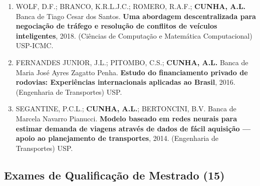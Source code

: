 \documentclass[
  brazilian,
  11pt,
  a4paper,
]{article}
\begin{document}
\begin{enumerate}
{  framework to analyse temporal and spatial distributions of crashes},
  2020. (PhD in Infrastructure Engineering) The University of Melbourne.
\item
  WOLF, D.F.; BRANCO, K.R.L.J.C.; ROMERO, R.A.F.; \textbf{CUNHA, A.L.}
  Banca de Tiago Cesar dos Santos. \textbf{Uma abordagem descentralizada
  para negociação de tráfego e resolução de conflitos de veículos
  inteligentes}, 2018. (Ciências de Computação e Matemática
  Computacional) USP-ICMC.
\item
  FERNANDES JUNIOR, J.L.; PITOMBO, C.S.; \textbf{CUNHA, A.L.} Banca de
  Maria José Ayres Zagatto Penha. \textbf{Estudo do financiamento
  privado de rodovias: Experiências internacionais aplicadas ao Brasil},
  2016. (Engenharia de Transportes) USP.
\item
  SEGANTINE, P.C.L.; \textbf{CUNHA, A.L.}; BERTONCINI, B.V. Banca de
  Marcela Navarro Pianucci. \textbf{Modelo baseado em redes neurais para
  estimar demanda de viagens através de dados de fácil aquisição ---
  apoio ao planejamento de transportes}, 2014. (Engenharia de
  Transportes) USP.
\end{enumerate}

\subsection{Exames de Qualificação de Mestrado
(15)}\label{exames-de-qualificauxe7uxe3o-de-mestrado-15}
\end{document}
